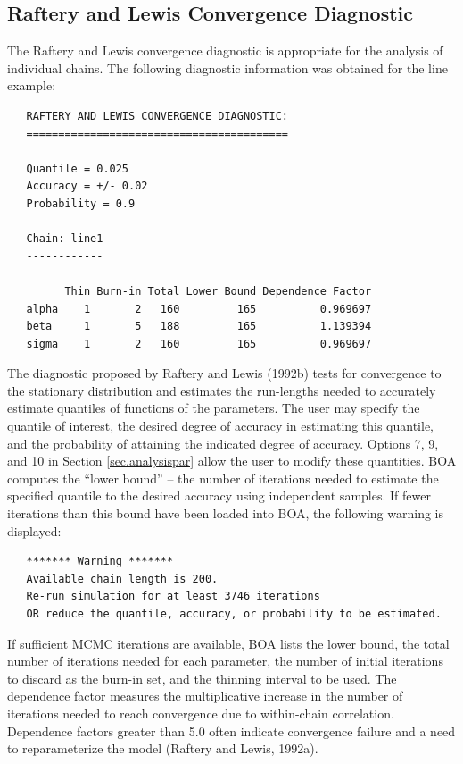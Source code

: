 \documentclass[12pt,letterpaper]{report}
\begin{document}
\subsection{Raftery and Lewis Convergence Diagnostic}
\noindent
The Raftery and Lewis convergence diagnostic is appropriate for the analysis of
individual chains. The following diagnostic information was obtained for the
line example:
\vskip 9pt
\begin{tiny}
\begin{verbatim}
   RAFTERY AND LEWIS CONVERGENCE DIAGNOSTIC:
   =========================================

   Quantile = 0.025
   Accuracy = +/- 0.02
   Probability = 0.9

   Chain: line1
   ------------

         Thin Burn-in Total Lower Bound Dependence Factor
   alpha    1       2   160         165          0.969697
   beta     1       5   188         165          1.139394
   sigma    1       2   160         165          0.969697
\end{verbatim}
\end{tiny}
The diagnostic proposed by Raftery and Lewis (1992b) tests for convergence to
the stationary distribution and estimates the run-lengths needed to accurately
estimate quantiles of functions of the parameters. The user may specify the
quantile of interest, the desired degree of accuracy in estimating this
quantile, and the probability of attaining the indicated degree of accuracy.
Options 7, 9, and 10 in Section \ref{sec.analysispar} allow the user to
modify these quantities. BOA computes the ``lower bound'' -- the number of
iterations needed to estimate the specified quantile to the desired accuracy
using independent samples.  If fewer iterations than this bound have been loaded
into BOA, the following warning is displayed:
\vskip 9pt
\begin{tiny}
\begin{verbatim}
   ******* Warning *******
   Available chain length is 200.
   Re-run simulation for at least 3746 iterations
   OR reduce the quantile, accuracy, or probability to be estimated.
\end{verbatim}
\end{tiny}
If sufficient MCMC iterations are available, BOA lists the lower bound, the
total number of iterations needed for each parameter, the number of initial
iterations to discard as the burn-in set, and the thinning interval to be used.
The dependence factor measures the multiplicative increase in the number of
iterations needed to reach convergence due to within-chain correlation.
Dependence factors greater than 5.0 often indicate convergence failure and a
need to reparameterize the model (Raftery and Lewis, 1992a).
\end{document}
